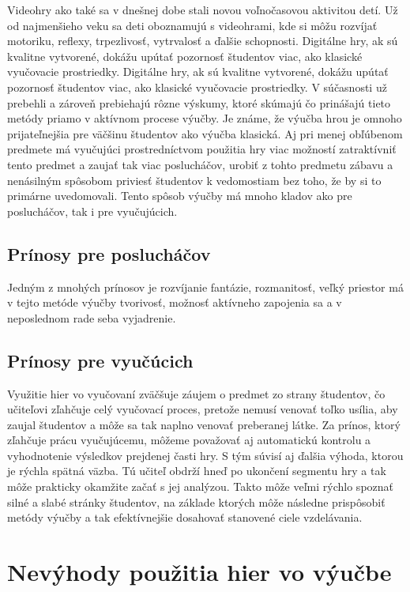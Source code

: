 \documentclass[10pt,twoside,slovak,a4paper]{article}
\begin{document}
Videohry ako také sa v dnešnej dobe stali novou voľnočasovou aktivitou detí. Už od najmenšieho veku sa deti oboznamujú s videohrami, kde si môžu rozvíjať motoriku, reflexy, trpezlivosť, vytrvalosť a ďalšie schopnosti\cite{Chen2012-ao}. Digitálne hry, ak sú kvalitne vytvorené, dokážu upútať pozornosť študentov viac, ako klasické vyučovacie prostriedky. Digitálne hry, ak sú kvalitne vytvorené, dokážu upútať pozornosť študentov viac, ako klasické vyučovacie prostriedky. V súčasnosti už prebehli a zároveň prebiehajú rôzne výskumy, ktoré skúmajú čo prinášajú tieto metódy priamo v aktívnom procese výučby. Je známe, že výučba hrou je omnoho prijateľnejšia pre väčšinu študentov ako výučba klasická. Aj pri menej obľúbenom predmete má vyučujúci prostredníctvom použitia hry viac možností zatraktívniť tento predmet a zaujať tak viac poslucháčov, urobiť z tohto predmetu zábavu a nenásilným spôsobom priviesť študentov k vedomostiam bez toho, že by si to primárne uvedomovali. Tento spôsob výučby má mnoho kladov ako pre poslucháčov, tak i pre vyučujúcich.

\subsection{Prínosy pre poslucháčov}

Jedným z mnohých prínosov je rozvíjanie fantázie, rozmanitosť, veľký priestor má v tejto metóde výučby tvorivosť, možnosť aktívneho zapojenia sa a v neposlednom rade seba vyjadrenie.

\subsection{Prínosy pre vyučúcich}

Využitie hier vo vyučovaní zväčšuje záujem o predmet zo strany študentov\cite{Ucenie}, čo učiteľovi zľahčuje celý vyučovací proces, pretože nemusí venovať toľko usília, aby zaujal študentov a môže sa tak naplno venovať preberanej látke. Za prínos, ktorý zľahčuje prácu vyučujúcemu, môžeme považovať aj automatickú kontrolu a vyhodnotenie výsledkov prejdenej časti hry. S tým súvisí aj ďalšia výhoda, ktorou je rýchla spätná väzba. Tú učiteľ obdrží hneď po ukončení segmentu hry a tak môže prakticky okamžite začať s jej analýzou. Takto môže veľmi rýchlo spoznať silné a slabé stránky študentov, na základe ktorých môže následne prispôsobiť metódy výučby a tak efektívnejšie dosahovať stanovené ciele vzdelávania.

\section{Nevýhody použitia hier vo výučbe}
\end{document}
